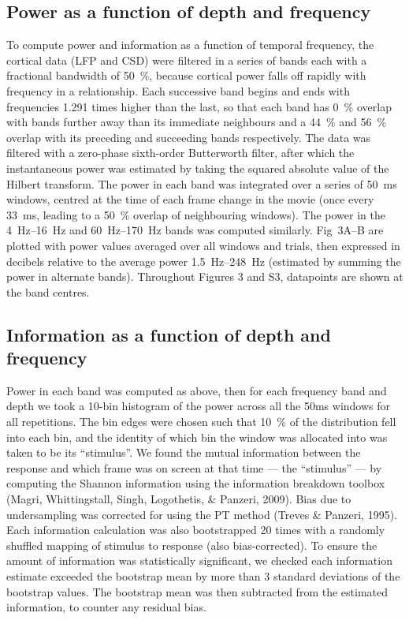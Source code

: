 \subsection{Power as a function of depth and frequency}
To compute power and information as a function of temporal frequency, the cortical data (\ac{LFP} and \ac{CSD}) were filtered in a series of bands each with a fractional bandwidth of \SI{50}{\percent}, because cortical power falls off rapidly with frequency in a  relationship.
Each successive band begins and ends with frequencies 1.291 times higher than the last, so that each band has \SI{0}{\percent} overlap with bands further away than its immediate neighbours and a \SI{44}{\percent} and \SI{56}{\percent} overlap with its preceding and succeeding bands respectively.
The data was filtered with a zero-phase sixth-order Butterworth filter, after which the instantaneous power was estimated by taking the squared absolute value of the Hilbert transform.
The power in each band was integrated over a series of \SI{50}{ms} windows, centred at the time of each frame change in the movie (once every \SI{33}{ms}, leading to a \SI{50}{\percent} overlap of neighbouring windows).
The power in the \SIrange{4}{16}{Hz} and \SIrange{60}{170}{Hz} bands was computed similarly.
Fig~3A--B are plotted with power values averaged over all windows and trials, then expressed in decibels relative to the average power \SIrange{1.5}{248}{Hz} (estimated by summing the power in alternate bands).
Throughout Figures 3 and S3, datapoints are shown at the band centres.

\subsection{Information as a function of depth and frequency}
Power in each band was computed as above, then for each frequency band and depth we took a 10-bin histogram of the power across all the 50ms windows for all repetitions.
The bin edges were chosen such that \SI{10}{\percent} of the distribution fell into each bin, and the identity of which bin the window was allocated into was taken to be its ``stimulus''.
We found the mutual information between the response and which frame was on screen at that time --- the ``stimulus'' --- by computing the Shannon information using the information breakdown toolbox (Magri, Whittingstall, Singh, Logothetis, \& Panzeri, 2009).
Bias due to undersampling was corrected for using the \ac{PT} method (Treves \& Panzeri, 1995).
Each information calculation was also bootstrapped 20 times with a randomly shuffled mapping of stimulus to response (also bias-corrected).
To ensure the amount of information was statistically significant, we checked each information estimate exceeded the bootstrap mean by more than 3 standard deviations of the bootstrap values.
The bootstrap mean was then subtracted from the estimated information, to counter any residual bias.

